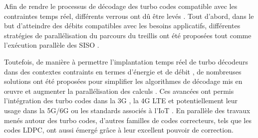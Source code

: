 \documentclass[../main.tex]{subfiles}
\begin{document}
Afin de rendre le processus de décodage des turbo codes compatible avec les contraintes temps réel, différents verrous ont dû être levés  \cite{TURBO:TEN,TURBO:SURVEY}. Tout d’abord, dans le but d'atteindre des débits compatibles avec les besoins applicatifs, différentes stratégies de parallélisation du parcours du treillis ont été proposées tout comme l’exécution parallèle des SISO \cite{TURBO:HARD3}.

Toutefois, de manière à permettre l’implantation temps réel de turbo décodeurs dans des contextes contraints en termes d’énergie et de débit \cite{TURBO:HARD2}, de nombreuses solutions ont été proposées pour simplifier les algorithmes de décodage \cite{TURBO:SURVEY} mis en œuvre et augmenter la parallélisation des calculs \cite{TURBO:ALGO1}. Ces avancées ont permis l’intégration des turbo codes dans la 3G \cite{3G}, la 4G LTE \cite{Ref_4G} et potentiellement leur usage dans la 5G/6G \cite{5g,Ref_6G} ou les standards associés à l’IoT \cite{ref_trubo_6g}.
En parallèle des travaux menés autour des turbo codes, d’autres familles de codes correcteurs, tels que les codes LDPC, ont aussi émergé grâce à leur excellent pouvoir de correction. 

% 
% 
% 
\end{document}
